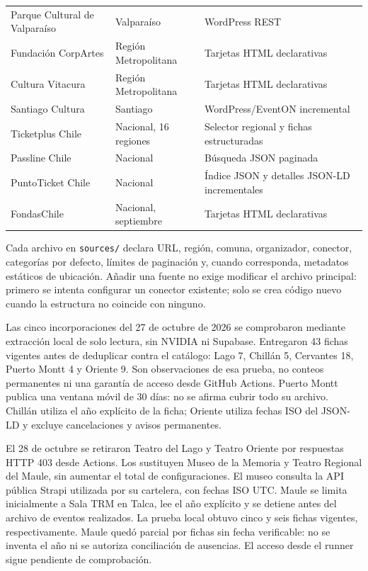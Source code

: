 \documentclass[11pt,a4paper]{article}
\begin{document}
\begin{longtable}{p{}p{}p{}}
Parque Cultural de Valpara\'{i}so & Valpara\'{i}so & WordPress REST \\
Fundaci\'{o}n CorpArtes & Regi\'{o}n Metropolitana & Tarjetas HTML declarativas \\
Cultura Vitacura & Regi\'{o}n Metropolitana & Tarjetas HTML declarativas \\
Santiago Cultura & Santiago & WordPress/EventON incremental \\
Ticketplus Chile & Nacional, 16 regiones & Selector regional y fichas estructuradas \\
Passline Chile & Nacional & B\'{u}squeda JSON paginada \\
PuntoTicket Chile & Nacional & \'{I}ndice JSON y detalles JSON-LD incrementales \\
FondasChile & Nacional, septiembre & Tarjetas HTML declarativas \\
\bottomrule
\end{longtable}
\normalsize

Cada archivo en \texttt{sources/} declara URL, regi\'{o}n, comuna, organizador, conector, categor\'{i}as por defecto, l\'{i}mites de paginaci\'{o}n y, cuando corresponda, metadatos est\'{a}ticos de ubicaci\'{o}n. A\~{n}adir una fuente no exige modificar el archivo principal: primero se intenta configurar un conector existente; solo se crea c\'{o}digo nuevo cuando la estructura no coincide con ninguno.

Las cinco incorporaciones del 27 de octubre de 2026 se comprobaron mediante extracci\'{o}n local de solo lectura, sin NVIDIA ni Supabase. Entregaron 43 fichas vigentes antes de deduplicar contra el cat\'{a}logo: Lago 7, Chill\'{a}n 5, Cervantes 18, Puerto Montt 4 y Oriente 9. Son observaciones de esa prueba, no conteos permanentes ni una garant\'{i}a de acceso desde GitHub Actions. Puerto Montt publica una ventana m\'{o}vil de 30 d\'{i}as: no se afirma cubrir todo su archivo. Chill\'{a}n utiliza el a\~{n}o expl\'{i}cito de la ficha; Oriente utiliza fechas ISO del JSON-LD y excluye cancelaciones y avisos permanentes.

El 28 de octubre se retiraron Teatro del Lago y Teatro Oriente por respuestas HTTP 403 desde Actions. Los sustituyen Museo de la Memoria y Teatro Regional del Maule, sin aumentar el total de configuraciones. El museo consulta la API p\'{u}blica Strapi utilizada por su cartelera, con fechas ISO UTC. Maule se limita inicialmente a Sala TRM en Talca, lee el a\~{n}o expl\'{i}cito y se detiene antes del archivo de eventos realizados. La prueba local obtuvo cinco y seis fichas vigentes, respectivamente. Maule qued\'{o} parcial por fichas sin fecha verificable: no se inventa el a\~{n}o ni se autoriza conciliaci\'{o}n de ausencias. El acceso desde el runner sigue pendiente de comprobaci\'{o}n.
\end{document}
